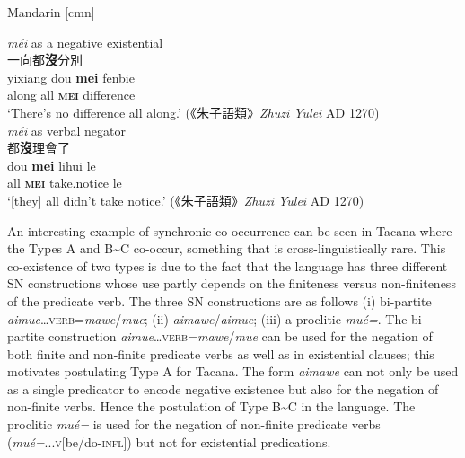 \documentclass[output=paper,chinesefont,colorlinks,citecolor=brown]{langscibook}
\begin{document}
\begin{exe}
\ex Mandarin [cmn]  \label{ex:mandarin2}
\begin{xlist}
\ex \textit{méi} as a negative existential \label{ex:mandarin2a}\\
{\cn 一向都\textbf{沒}分別}\\
\gll yixiang dou \textbf{mei} fenbie\\
 along all \textbf{\textsc{mei}} difference\\
 \glt `There's no difference all along.' ({\cn 《朱子語類》}\emph{Zhuzi Yulei} AD 1270)\\

\ex \textit{méi} as verbal negator \label{ex:mandarin2b}\\
{\cn 都\textbf{沒}理會了}\\
\gll dou \textbf{mei} lihui le\\
  all \textbf{\textsc{mei}} take.notice le\\
  \glt `[they] all didn't take notice.' ({\cn 《朱子語類》}\emph{Zhuzi Yulei} AD 1270)

\end{xlist}
\end{exe}

An interesting example of synchronic co-occurrence can be seen in Tacana  where the Types A and B{\textasciitilde}C co-occur, something that is cross-linguistically rare. This co-existence of two types is due to the fact that the language has three different SN constructions whose use partly depends on the finiteness versus non-finiteness of the predicate verb. The three SN constructions are as follows
(i) bi-partite \textit{aimue}…\textsc{verb}=\textit{mawe}{\slash}\textit{mue};
(ii) \textit{aimawe}{\slash}\textit{aimue};
(iii) a proclitic \textit{mué=}.  The bi-partite construction \textit{aimue}…\textsc{verb}=\textit{mawe}{\slash}\textit{mue} can be used for the negation of both finite and non-finite predicate verbs as well as in existential clauses; this motivates postulating Type A for Tacana. The form \textit{aimawe} can not only be used as a single predicator to encode negative existence but also for the negation of non-finite verbs. Hence the postulation of Type B{\textasciitilde}C in the language. The proclitic \textit{mué=} is used for the negation of non-finite predicate verbs (\textit{mué=}...\textsc{v}[be/do-\textsc{infl}]) but not for existential predications.
\end{document}
